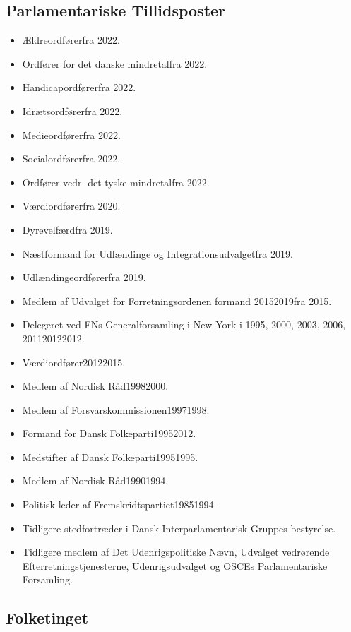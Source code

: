 \documentclass[11pt, a4paper]{awesome-cv}
\begin{document}
\begin{cvletter}
\subsection*{Parlamentariske Tillidsposter}
\begin{itemize}
\item Ældreordførerfra 2022.
\item Ordfører for det danske mindretalfra 2022.
\item Handicapordførerfra 2022.
\item Idrætsordførerfra 2022.
\item Medieordførerfra 2022.
\item Socialordførerfra 2022.
\item Ordfører vedr. det tyske mindretalfra 2022.
\item Værdiordførerfra 2020.
\item Dyrevelfærdfra 2019.
\item Næstformand for Udlændinge og Integrationsudvalgetfra 2019.
\item Udlændingeordførerfra 2019.
\item Medlem af Udvalget for Forretningsordenen formand 20152019fra 2015.
\item Delegeret ved FNs Generalforsamling i New York i 1995, 2000, 2003, 2006, 201120122012.
\item Værdiordfører20122015.
\item Medlem af Nordisk Råd19982000.
\item Medlem af Forsvarskommissionen19971998.
\item Formand for Dansk Folkeparti19952012.
\item Medstifter af Dansk Folkeparti19951995.
\item Medlem af Nordisk Råd19901994.
\item Politisk leder af Fremskridtspartiet19851994.
\item Tidligere stedfortræder i Dansk Interparlamentarisk Gruppes bestyrelse.
\item Tidligere medlem af Det Udenrigspolitiske Nævn, Udvalget vedrørende Efterretningstjenesterne, Udenrigsudvalget og OSCEs Parlamentariske Forsamling.
\end{itemize}
\subsection*{Folketinget}

\end{cvletter}
\end{document}
